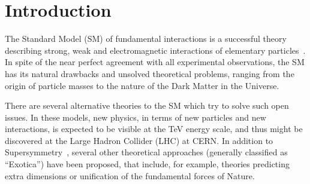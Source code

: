 \documentclass{cmspaper}
\begin{document}
%
%
%
%
%  
%

\section{Introduction}
The Standard Model (SM) of fundamental interactions is a successful theory 
describing strong, weak and electromagnetic interactions of elementary 
particles~\cite{Weinberg:1979pi}. 
In spite of the near perfect agreement with all experimental 
observations, the SM has its natural drawbacks and unsolved theoretical 
problems, ranging from the origin of particle masses to the nature of the 
Dark Matter in the Universe.

There are several alternative theories to the SM which try to solve such 
open issues. In these models, new physics, in terms of new particles and 
new interactions, is expected to be visible at the TeV energy scale, and 
thus might be discovered at the Large Hadron Collider (LHC) at CERN.
In addition to Supersymmetry~\cite{Martin:1997ns}, 
several other theoretical approaches 
(generally classified as ``Exotica'') have been proposed, 
that include, for example, theories predicting extra dimensions or 
unification of the fundamental forces of Nature.
\end{document}
